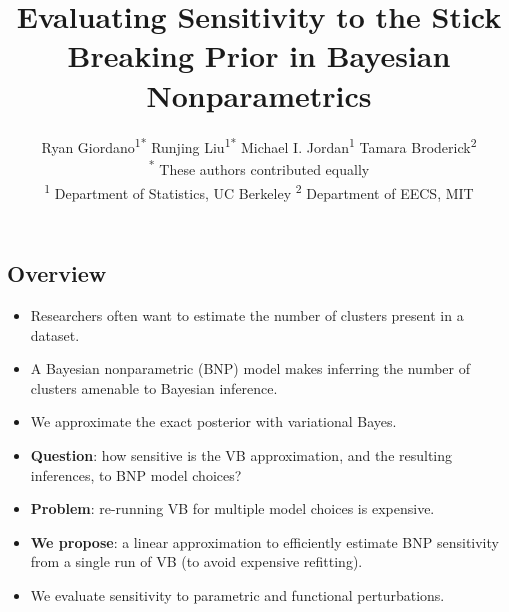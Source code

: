 \documentclass[a0,plainsections,30pt]{sciposter}\usepackage[]{graphicx}\usepackage[]{color}
\title{\textcolor{mydarkblue}{Evaluating Sensitivity to the Stick Breaking Prior in Bayesian Nonparametrics
}}
\author{Ryan Giordano\textsuperscript{1*} \quad
Runjing Liu\textsuperscript{1*} \quad
Michael I. Jordan\textsuperscript{1} \quad
Tamara Broderick\textsuperscript{2} \\
{\large\normalfont\textsuperscript{*} These authors contributed equally}\\
 {\large\normalfont\textsuperscript{1} Department of Statistics, UC Berkeley \quad \textsuperscript{2} Department of EECS, MIT}
 }
\begin{document}

\setlength{\parskip}{0.25em}

\maketitle

\vspace{-1in}






\begin{minipage}[t]{0.45\textwidth}

\begin{mdframed}[style=MyFrame]
\section*{Overview}
\vspace{-0.3in}
\begin{itemize}
\item Researchers often want to estimate the number of clusters present in a dataset.

\item A Bayesian nonparametric (BNP) model makes inferring the number of clusters amenable to Bayesian inference.

\item We approximate the exact posterior with variational Bayes.

\item \textbf{Question}: how sensitive is the
VB approximation, and the resulting inferences, to BNP model choices?

\item \textbf{Problem}: re-running VB for multiple model choices is expensive.

\item \textbf{We propose}: a linear approximation to efficiently
estimate BNP sensitivity from a single run of VB (to avoid
expensive refitting).

\item We evaluate sensitivity to parametric and functional perturbations.

\end{itemize}
\end{mdframed}
\vspace{-0.7in}


\end{minipage}
\end{document}
